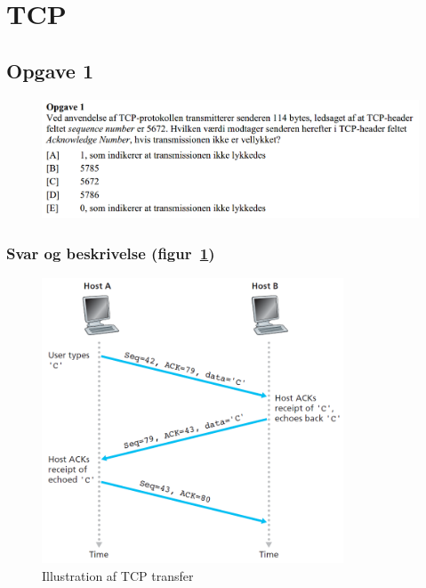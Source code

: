 \section{TCP}
\subsection{Opgave 1}
\begin{figure}[H]
	\centering
	\includegraphics[width=\linewidth]{figs/tcp/SE15OP1}
	\caption{}
	\label{fig:SE15OP1}
\end{figure}

\subsubsection{Svar og beskrivelse (figur~\ref{fig:SE15OP1})}

\begin{figure}[H]
	\centering
	\includegraphics[width=0.8\textwidth]{figs/tcp/tcptransfer}
	\caption{Illustration af TCP transfer}
	\label{fig:TCPtransfer}
\end{figure}